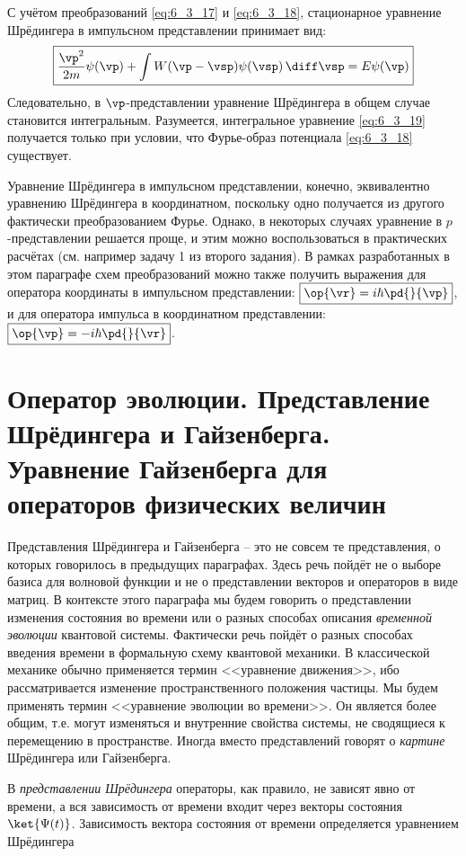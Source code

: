 С учётом преобразований \eqref{eq:6_3_17} и \eqref{eq:6_3_18}, стационарное уравнение Шрёдингера в импульсном представлении принимает вид:
\begin{equation}
\label{eq:6_3_19}
	\boxed{\frac{\vp^2}{2m} \psi(\vp) + \int W(\vp - \vsp) \psi(\vsp) \, \diff\vsp  = E\psi(\vp)}
\end{equation}%
%
Следовательно, в $\vp$-представлении уравнение Шрёдингера в общем случае становится интегральным. Разумеется, интегральное уравнение \eqref{eq:6_3_19} получается только при условии, что Фурье-образ потенциала \eqref{eq:6_3_18} существует.

Уравнение Шрёдингера в импульсном представлении, конечно, эквивалентно уравнению Шрёдингера в координатном, поскольку одно получается из другого фактически преобразованием Фурье. Однако, в некоторых случаях уравнение в $p$-представлении решается проще, и этим можно воспользоваться в практических расчётах (см. например задачу 1 из второго задания). В рамках разработанных в этом параграфе схем преобразований можно также получить выражения для оператора координаты в импульсном представлении: $\boxed{\op{\vr} = i\hbar \pd{}{\vp}}$, и для оператора импульса в координатном представлении: $\boxed{\op{\vp} = -i\hbar \pd{}{\vr}}$.

\section{Оператор эволюции. Представление Шрёдингера и Гайзенберга. Уравнение Гайзенберга для операторов физических величин}

Представления Шрёдингера и Гайзенберга -- это не совсем те представления, о которых говорилось в предыдущих параграфах. Здесь речь пойдёт не о выборе базиса для волновой функции и не о представлении векторов и операторов в виде матриц. В контексте этого параграфа мы будем говорить о представлении изменения состояния во времени или о разных способах описания {\em временной эволюции} квантовой системы. Фактически речь пойдёт о разных способах введения времени в формальную схему квантовой механики. В классической механике обычно применяется термин <<уравнение движения>>, ибо рассматривается изменение пространственного положения частицы. Мы будем применять термин <<уравнение эволюции во времени>>. Он является более общим, т.е. могут изменяться и внутренние свойства системы, не сводящиеся к перемещению в пространстве. Иногда вместо представлений говорят о {\em картине} Шрёдингера или Гайзенберга.

В {\em представлении Шрёдингера} операторы, как правило, не зависят явно от времени, а вся зависимость от времени входит через векторы состояния $\ket{\Psi(t)}$. Зависимость вектора состояния от времени определяется уравнением Шрёдингера

